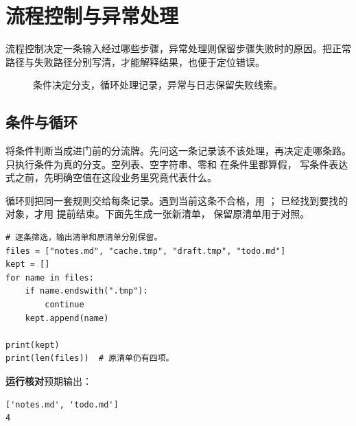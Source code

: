\chapter{流程控制与异常处理}
\label{ch:03-outline}

流程控制决定一条输入经过哪些步骤，异常处理则保留步骤失败时的原因。把正常路径与失败路径分别写清，才能解释结果，也便于定位错误。


\begin{figure}[htbp]
  \centering
  \caption*{条件决定分支，循环处理记录，异常与日志保留失败线索。}
\end{figure}


\section{条件与循环}

将条件判断当成进门前的分流牌。先问这一条记录该不该处理，再决定走哪条路。
 只执行条件为真的分支。空列表、空字符串、零和  在条件里都算假，
写条件表达式之前，先明确空值在这段业务里究竟代表什么。

循环则把同一套规则交给每条记录。遇到当前这条不合格，用 ；
已经找到要找的对象，才用  提前结束。下面先生成一张新清单，
保留原清单用于对照。


\begin{lstlisting}[title={\code{filter_tasks.py}}]
# 逐条筛选，输出清单和原清单分别保留。
files = ["notes.md", "cache.tmp", "draft.tmp", "todo.md"]
kept = []
for name in files:
    if name.endswith(".tmp"):
        continue
    kept.append(name)

print(kept)
print(len(files))  # 原清单仍有四项。
\end{lstlisting}


\textbf{运行核对}\enspace 预期输出：
\begin{lstlisting}[language={},numbers=none]
['notes.md', 'todo.md']
4
\end{lstlisting}

